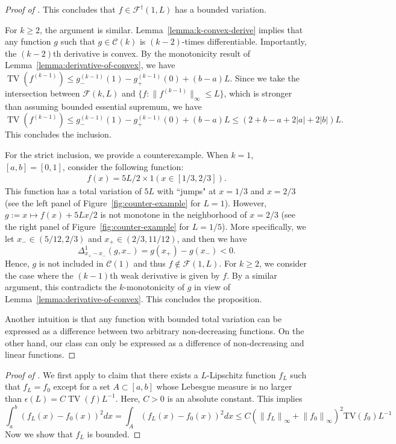 \documentclass[12pt]{article}
\begin{document}
\begin{appendices}
\begin{proof}[Proof of ]
    This concludes that $f\in \mathcal{F}^\dagger(1,L)$ has a bounded variation. 
    
    For $k\ge 2$, the argument is similar. Lemma~\ref{lemma:k-convex-derive} implies that any function $g$ such that $g \in \mathcal{C}(k)$ is $(k-2)$-times differentiable. Importantly, the $(k-2)$th derivative is convex. By the monotonicity result of Lemma~\ref{lemma:derivative-of-convex},
    we have $\operatorname{TV}(f^{(k-1)}) \le g_-^{(k-1)}(1)-g_+^{(k-1)}(0)+(b-a)L$. Since we take the intersection between $\mathcal{F}(k,L)$ and $\{f: \|f^{(k-1)}\|_{\infty} \le L\}$, which is stronger than assuming bounded essential supremum, we have 
    \[\operatorname{TV}(f^{(k-1)}) \le g_-^{(k-1)}(1)-g_+^{(k-1)}(0)+ (b-a)L \le (2+b-a+2|a| + 2|b|) L.\]
    This concludes the inclusion. 
    
    For the strict inclusion, we provide a counterexample. When $k=1$, $[a,b] = [0,1]$, consider the following function:
    \begin{align*}
        f(x) = 5L/2\times 1(x\in [1/3, 2/3]).
    \end{align*}
    This function has a total variation of $5L$ with ``jumps" at $x=1/3$ and $x=2/3$ (see the left panel of Figure~\ref{fig:counter-example} for $L=1$). However, $g := x\mapsto f(x)+5Lx/2$ is not monotone in the neighborhood of $x=2/3$ (see the right panel of Figure~\ref{fig:counter-example} for $L=1/5$). More specifically, we let $x_- \in (5/12, 2/3)$ and $x_+ \in (2/3, 11/12)$, and then we have 
    \[\Delta_{x_+-x_-}^1(g, x_-) = g(x_+)-g(x_-) < 0.\]
    Hence, $g$ is not included in $\mathcal{C}(1)$ and thus $f \notin \mathcal{F}(1,L)$. For $k\ge 2$, we consider the case where the $(k-1)$th weak derivative is given by $f$. By a similar argument, this contradicts the $k$-monotonicity of $g$ in view of Lemma~\ref{lemma:derivative-of-convex}. This concludes the proposition.
    
    Another intuition is that any function with bounded total variation can be expressed as a difference between two arbitrary non-decreasing functions. On the other hand, our class can only be expressed as a difference of non-decreasing and linear functions. 
\end{proof}

\begin{proof}[Proof of ]
    We first apply \cite[Section 6.6.2, Theorem 2]{evans2018measure} to claim that there exists a $L$-Lipschitz function $f_L$ such that $f_L = f_0$ except for a set $A\subset [a,b]$ whose Lebesgue measure is no larger than $\epsilon(L) = C\operatorname{TV}(f)L^{-1}$. Here, $C>0$ is an absolute constant. This implies
    \begin{equation}\label{eq: bound L2 BV}
\int_a^b\left(f_L(x)-f_0(x)\right)^2 d x=\int_A\left(f_L(x)-f_0(x)\right)^2 d x \leq C\left(\left\|f_L\right\|_{\infty}+\left\|f_0\right\|_{\infty}\right)^2 \mathrm{TV}(f_0) L^{-1}
\end{equation}
Now we show that $f_L$ is bounded. 


\end{proof}
\end{appendices}
\end{document}
